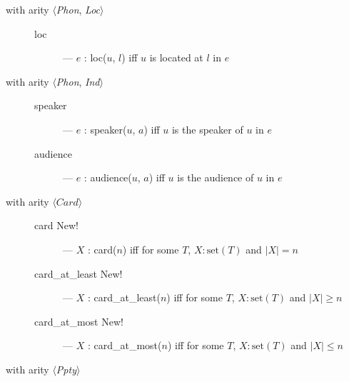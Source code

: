 \begin{description}

 \item[with arity \textnormal{$\langle$\textit{Phon},
    \textit{Loc}$\rangle$}] \mbox{}
  
    \begin{description}

    \item[\textnormal{loc}] --- $e$ : loc($u$, $l$) iff $u$ is located
      at $l$ in $e$

    \end{description}
    
  \item[with arity \textnormal{$\langle$\textit{Phon},
      \textit{Ind}$\rangle$}] \mbox{}

    \begin{description}

    \item[\textnormal{speaker}] --- $e$ : speaker($u$, $a$) iff $u$
        is the speaker of $u$ in $e$

    \item[\textnormal{audience}] --- $e$ : audience($u$, $a$) iff
        $u$ is the audience of $u$ in $e$

      \end{description}

    \item[with arity \textnormal{$\langle\textit{Card}\rangle$}] \mbox{}

  \begin{description}
    
  \item[\textnormal{card} New!] --- $X$ : card($n$) iff for some $T$,
    $X:\mathrm{set}(T)$ and $|X|=n$
    
  \item[\textnormal{card\_at\_least} New!] --- $X$ : card\_at\_least($n$) iff for some $T$, $X:\mathrm{set}(T)$
    and $|X|\geq n$

    
  \item[\textnormal{card\_at\_most} New!] --- $X$ : card\_at\_most($n$) iff for some $T$, $X:\mathrm{set}(T)$
    and $|X|\leq n$

  \end{description}
      
  \item[with arity \textnormal{$\langle$\textit{Ppty}$\rangle$}]
    \mbox{}

    \begin{description}
      

\end{description}
\end{description}
